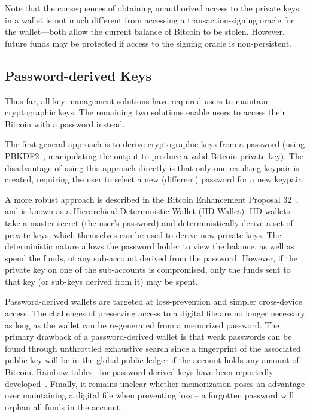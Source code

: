 Note that the consequences of obtaining unauthorized access to the private keys in a wallet is not much different from accessing a transaction-signing oracle for the wallet---both allow the current balance of Bitcoin to be stolen. However, future funds may be protected if access to the signing oracle is non-persistent. 


\subsection{Password-derived Keys} 
Thus far, all key management solutions have required users to maintain cryptographic keys. The remaining two solutions enable users to access their Bitcoin with a password instead. 

The first general approach is to derive cryptographic keys from a password (\eg using PBKDF2~\cite{pbkdf2}, manipulating the output to produce a valid Bitcoin private key). The disadvantage of using this approach directly is that only one resulting keypair is created, requiring the user to select a new (different) password for a new keypair. 

A more robust approach is described in the Bitcoin Enhancement Proposal 32~\cite{bip32}, and is known as a Hierarchical Deterministic Wallet (HD Wallet). HD wallets take a master secret (the user's password) and deterministically derive a set of private keys, which themselves can be used to derive new private keys. The deterministic nature allows the password holder to view the balance, as well as spend the funds, of any sub-account derived from the password. However, if the private key on one of the sub-accounts is compromised, only the funds sent to that key (or sub-keys derived from it) may be spent. 


Password-derived wallets are targeted at loss-prevention and simpler cross-device access. The challenges of preserving access to a digital file are no longer necessary as long as the wallet can be re-generated from a memorized password. The primary drawback of a password-derived wallet is that weak passwords can be found through unthrottled exhaustive search since a fingerprint of the associated public key will be in the global public ledger if the account holds any amount of Bitcoin. Rainbow tables~\cite{oechslin2003making} for password-derived keys have been reportedly developed~\cite{}. Finally, it remains unclear whether memorization poses an advantage over maintaining a digital file when preventing loss -- a forgotten password will orphan all funds in the account.


